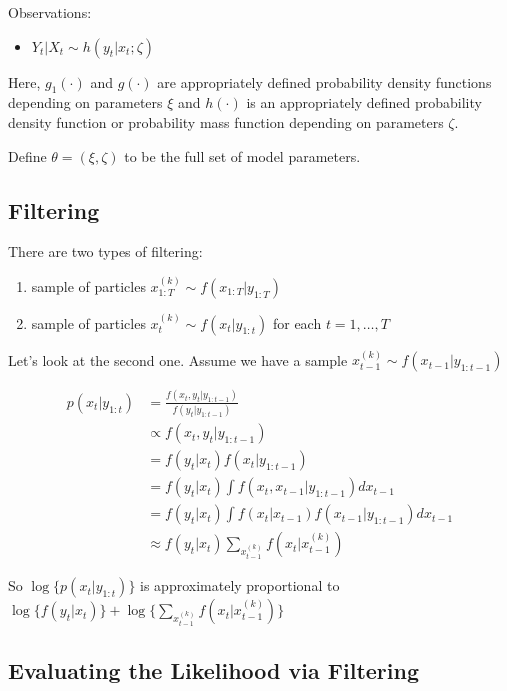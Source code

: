 \documentclass[]{article}
\providecommand{\tightlist}{%
  \setlength{\itemsep}{0pt}\setlength{\parskip}{0pt}}
\begin{document}
Observations:

\begin{itemize}
\item $Y_t \vert X_{t} \sim h(y_t | x_t ; \zeta)$
\end{itemize}

Here, \(g_1(\cdot)\) and \(g(\cdot)\) are appropriately defined
probability density functions depending on parameters \(\xi\) and
\(h(\cdot)\) is an appropriately defined probability density function or
probability mass function depending on parameters \(\zeta\).

Define \(\theta = (\xi, \zeta)\) to be the full set of model parameters.

\subsection{Filtering}\label{filtering}

There are two types of filtering:

\begin{enumerate}
\def\labelenumi{\arabic{enumi}.}
\tightlist
\item
  sample of particles \(x_{1:T}^{(k)} \sim f(x_{1:T} | y_{1:T})\)
\item
  sample of particles \(x_{t}^{(k)} \sim f(x_{t} | y_{1:t})\) for each
  \(t = 1, \ldots, T\)
\end{enumerate}

Let's look at the second one. Assume we have a sample
\(x_{t-1}^{(k)} \sim f(x_{t-1} | y_{1:t-1})\)

\begin{align*}
p(x_{t} | y_{1:t}) &= \frac{f(x_t, y_t | y_{1:t-1})}{f(y_t | y_{1:t-1})} \\
 &\propto f(x_t, y_t | y_{1:t-1}) \\
 &= f(y_t | x_t) f(x_t | y_{1:t-1}) \\
 &= f(y_t | x_t) \int f(x_t, x_{t-1} | y_{1:t-1}) d x_{t-1} \\
 &= f(y_t | x_t) \int f(x_t | x_{t - 1}) f(x_{t-1} | y_{1:{t-1}}) dx_{t-1} \\
 &\approx f(y_t | x_t) \sum_{x_{t-1}^{(k)}} f(x_t | x_{t - 1}^{(k)})
\end{align*}

So \(\log\{p(x_{t} | y_{1:t})\}\) is approximately proportional to
\(\log\{f(y_t | x_t)\} + \log\{\sum_{x_{t-1}^{(k)}} f(x_t | x_{t - 1}^{(k)})\}\)

\subsection{Evaluating the Likelihood via
Filtering}\label{evaluating-the-likelihood-via-filtering}
\end{document}
